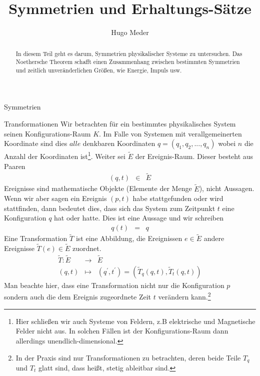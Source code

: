\documentclass[a4paper,fleqn]{article}
\title{Symmetrien und Erhaltungs-Sätze}
\numberwithin{equation}{section}
\begin{document}
\author{Hugo Meder}
\begin{titlepage}
\maketitle
\end{titlepage}
\tableofcontents

\begin{abstract}
In diesem Teil geht es darum, Symmetrien physikalischer Systeme zu untersuchen. Das Noethersche Theorem schafft einen Zusammenhang
zwischen bestimmten Symmetrien und zeitlich unveränderlichen Größen, wie Energie, Impuls usw.
\end{abstract}

\begin{section}{Symmetrien}
\begin{subsection}{Transformationen}
Wir betrachten für ein bestimmtes physikalisches System seinen Konfigurations-Raum $K$. Im Falle von Systemen mit verallgemeinerten Koordinate sind dies $alle$ denkbaren Koordinaten $q=(q_1,q_2,...,q_n)$ wobei $n$ die Anzahl der Koordinaten ist\footnote{Hier schließen wir auch Systeme von Feldern, z.B elektrische und Magnetische Felder nicht aus. In solchen Fällen ist der Konfigurations-Raum
dann allerdings unendlich-dimensional.}. Weiter sei $\tilde{E}$ der Ereignis-Raum. Dieser besteht aus Paaren
\begin{eqnarray*}
(q,t) &\in& \tilde{E}
\end{eqnarray*}
Ereignisse sind mathematische Objekte (Elemente der Menge $\tilde{E}$), nicht Aussagen. Wenn wir aber sagen ein Ereignis
$(p,t)$ habe stattgefunden oder wird stattfinden, dann bedeutet dies, dass sich das System zum Zeitpunkt $t$ eine Konfiguration $q$
hat oder hatte. Dies ist eine Aussage und wir schreiben
\begin{eqnarray*}
q(t) &=& q
\end{eqnarray*}
Eine Transformation $\tilde{T}$ ist eine Abbildung, die Ereignissen $e\in\tilde{E}$ andere Ereignisse $\tilde{T}(e)\in\tilde{E}$
zuordnet. 
\begin{eqnarray*}
\tilde{T}: \tilde{E} &\rightarrow&\tilde{E}\\
(q,t) &\mapsto& ( q^\prime,t^\prime)=\left(\tilde{T}_q(q,t), \tilde{T}_t(q,t)\right)
\end{eqnarray*}
Man beachte hier, dass eine Transformation nicht nur die Konfiguration $p$ sondern auch die dem Ereignis zugeordnete Zeit $t$ verändern kann.\footnote{In der Praxis sind nur Transformationen zu betrachten, deren beide Teile $T_q$ und $T_t$ glatt sind, dass heißt, stetig ableitbar sind.}

\end{subsection}
\end{section}
\end{document}

